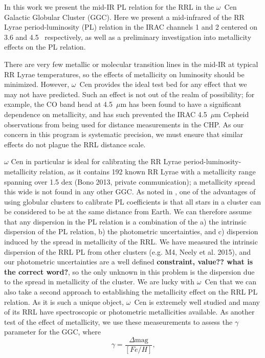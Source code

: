 \documentclass[a4paper,fleqn,usenatbib]{mnras}
\begin{document}
In this work we present the mid-IR PL relation for the RRL in the $\omega$~Cen Galactic Globular Cluster (GGC). 
Here we present a mid-infrared of the RR Lyrae period-luminosity (PL) relation in the IRAC channels 1 and 2 centered on 3.6 and 4.5 \micron\ respectively, as well as a preliminary investigation into metallicity effects on the PL relation.

There are very few metallic or molecular transition lines in the mid-IR at typical RR Lyrae temperatures, so the effects of metallicity on luminosity should be minimized. However, $\omega$~Cen provides the ideal test bed for any effect that we may not have predicted. Such an effect is not out of the realm of possibility; for example, the CO band head at 4.5~$\mu$m has been found to have a significant dependence on metallicity, and has such prevented the IRAC 4.5~$\mu$m Cepheid observations from being used for distance measurements in the CHP. As our concern in this program is systematic precision, we must ensure that similar effects do not plague the RRL distance scale.  

$\omega$ Cen in particular is ideal for calibrating the RR Lyrae period-luminosity-metallicity relation, as it contains 192 known RR Lyrae \citep{2004A&A...424.1101K} with a metallicity range spanning over 1.5 dex (Bono 2013, private communication); a metallicity spread this wide is not found in any other GGC. As noted in \citet{2006MNRAS.372.1675S}, one of the advantages of using globular clusters to calibrate PL coefficients is that all stars in a cluster can be considered to be at the same distance from Earth. We can therefore assume that any dispersion in the PL relation is a combination of the a) the intrinsic dispersion of the PL relation, b) the photometric uncertainties, and c) dispersion induced by the spread in metallicity of the RRL. We have measured the intrinsic dispersion of the RRL PL from other clusters (e.g. M4, Neely et al. 2015), and our photometric uncertainties are a well defined \textbf{constraint, value?? what is the correct word?}, so the only unknown in this problem is the dispersion due to the spread in metallicity of the cluster. We are lucky with $\omega$~Cen that we can also take a second approach to establishing the metallicity effect on the RRL PL relation. As it is such a unique object, $\omega$~Cen is extremely well studied and many of its RRL have spectroscopic or photometric metallicities available. As another test of the effect of metallicity, we use these measeurements to assess the $\gamma$ parameter for the GGC, where 
\begin{equation} \label{eqn:gamma}
\gamma = \dfrac {\Delta \text{mag}} {[Fe/H]}\text{,}
\end{equation}
\end{document}
